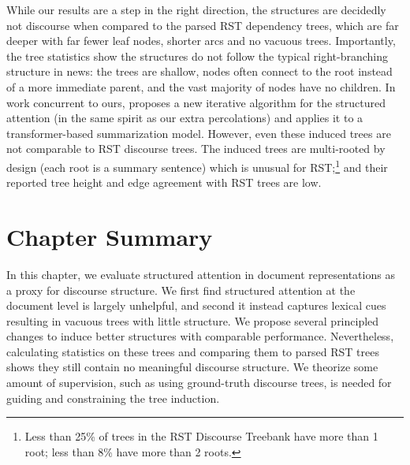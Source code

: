 While our results are a step in the right direction, the structures are decidedly not discourse when compared to the parsed RST dependency trees, which are far deeper with far fewer leaf nodes, shorter arcs and no vacuous trees. Importantly, the tree statistics show the structures do not follow the typical right-branching structure in news: the trees are shallow, nodes often connect to the root instead of a more immediate parent, and the vast majority of nodes have no children. In work concurrent to ours, \citet{Liu:2019} proposes a new iterative algorithm for the structured attention (in the same spirit as our extra percolations) and applies it to a transformer-based summarization model. However, even these induced trees are not comparable to RST discourse trees. The induced trees are multi-rooted by design (each root is a summary sentence) which is unusual for RST;\footnote{Less than 25\% of trees in the RST Discourse Treebank \cite{Carlson:2001} have more than 1 root; less than 8\% have more than 2 roots.} and their reported tree height and edge agreement with RST trees are low.

\section{Chapter Summary}
In this chapter, we evaluate structured attention in document representations as a proxy for discourse structure. We first find structured attention at the document level is largely unhelpful, and second it instead captures lexical cues resulting in vacuous trees with little structure. 
We propose several principled changes to induce better structures with comparable performance. Nevertheless, calculating statistics on these trees and comparing them to parsed RST trees shows they still contain no meaningful discourse structure. 
We theorize some amount of supervision, such as using ground-truth discourse trees, is needed for guiding and constraining the tree induction.


